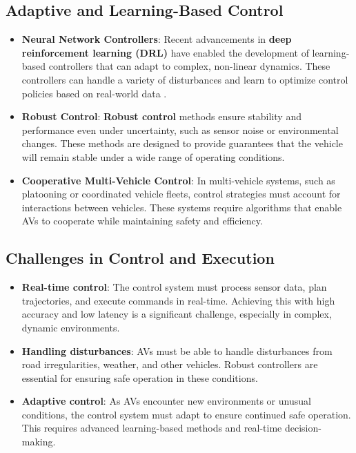 \documentclass[12pt,a4paper]{article}
\begin{document}
\subsection{Adaptive and Learning-Based Control}
\begin{itemize}
    \item \textbf{Neural Network Controllers}: Recent advancements in \textbf{deep reinforcement learning (DRL)} have enabled the development of learning-based controllers that can adapt to complex, non-linear dynamics. These controllers can handle a variety of disturbances and learn to optimize control policies based on real-world data \cite{kuutti2019survey}.
    \item \textbf{Robust Control}: \textbf{Robust control} methods ensure stability and performance even under uncertainty, such as sensor noise or environmental changes. These methods are designed to provide guarantees that the vehicle will remain stable under a wide range of operating conditions.
    \item \textbf{Cooperative Multi-Vehicle Control}: In multi-vehicle systems, such as platooning or coordinated vehicle fleets, control strategies must account for interactions between vehicles. These systems require algorithms that enable AVs to cooperate while maintaining safety and efficiency.
\end{itemize}

\subsection{Challenges in Control and Execution}
\begin{itemize}
    \item \textbf{Real-time control}: The control system must process sensor data, plan trajectories, and execute commands in real-time. Achieving this with high accuracy and low latency is a significant challenge, especially in complex, dynamic environments.
    \item \textbf{Handling disturbances}: AVs must be able to handle disturbances from road irregularities, weather, and other vehicles. Robust controllers are essential for ensuring safe operation in these conditions.
    \item \textbf{Adaptive control}: As AVs encounter new environments or unusual conditions, the control system must adapt to ensure continued safe operation. This requires advanced learning-based methods and real-time decision-making.
\end{itemize}
\end{document}

